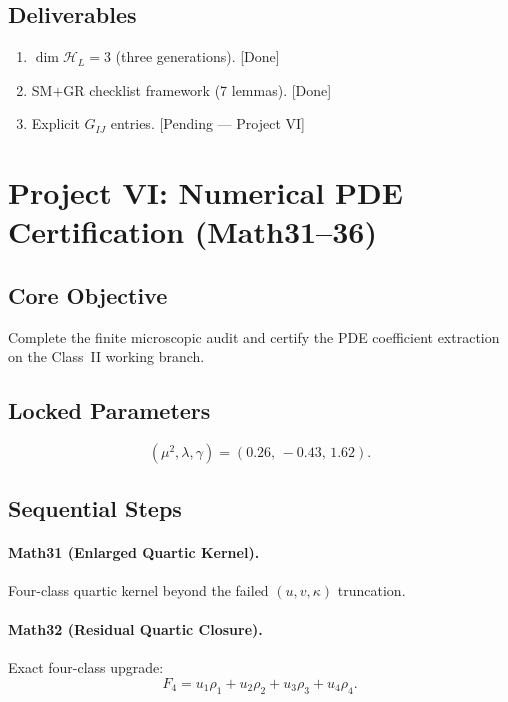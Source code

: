 \documentclass[11pt,a4paper]{article}
\newcommand{\HilL}{\mathcal{H}_{L}}
\begin{document}
\subsection{Deliverables}
\begin{enumerate}
\item $\dim\HilL=3$ (three generations). \hfill\textcolor{green!55!black}{[Done]}
\item SM$+$GR checklist framework (7 lemmas). \hfill\textcolor{green!55!black}{[Done]}
\item Explicit $G_{IJ}$ entries. \hfill\textcolor{red!70!black}{[Pending --- Project VI]}
\end{enumerate}

\section{Project VI: Numerical PDE Certification (Math31--36)}

\subsection{Core Objective}
Complete the finite microscopic audit and certify the PDE coefficient
extraction on the Class~II working branch.

\subsection{Locked Parameters}
\begin{equation}
\boxed{(\mu^{2},\lambda,\gamma)=(0.26,\,-0.43,\,1.62).}
\label{eq:locked}
\end{equation}

\subsection{Sequential Steps}

\paragraph{Math31 (Enlarged Quartic Kernel).}
Four-class quartic kernel beyond the failed $(u,v,\kappa)$ truncation.

\paragraph{Math32 (Residual Quartic Closure).}
Exact four-class upgrade:
\begin{equation}
F_{4}=u_{1}\rho_{1}+u_{2}\rho_{2}+u_{3}\rho_{3}+u_{4}\rho_{4}.
\end{equation}
\end{document}
